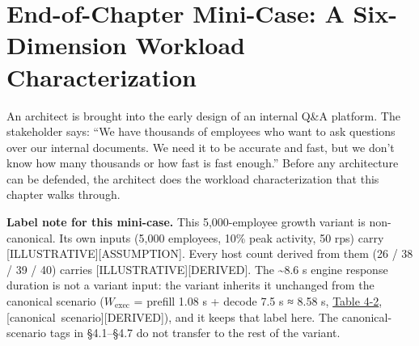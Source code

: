 \section{End-of-Chapter Mini-Case: A Six-Dimension Workload
Characterization}\label{end-of-chapter-mini-case-a-six-dimension-workload-characterization}

An architect is brought into the early design of an internal Q\&A
platform. The stakeholder says: ``We have thousands of employees who
want to ask questions over our internal documents. We need it to be
accurate and fast, but we don't know how many thousands or how fast is
fast enough.'' Before any architecture can be defended, the architect
does the workload characterization that this chapter walks through.

\textbf{Label note for this mini-case.} This 5,000-employee growth
variant is non-canonical. Its own inputs (5,000 employees, 10\% peak
activity, 50 rps) carry \mbox{{[}ILLUSTRATIVE{]}}\hspace{0pt}\mbox{{[}ASSUMPTION{]}}. Every host
count derived from them (26 / 38 / 39 / 40) carries
\mbox{{[}ILLUSTRATIVE{]}}\hspace{0pt}\mbox{{[}DERIVED{]}}. The \textasciitilde8.6 s engine
response duration is not a variant input: the variant inherits it
unchanged from the canonical scenario (\(W_{\mathrm{exec}}\) = prefill
1.08 s + decode 7.5 s ≈ 8.58 s, \hyperref[tab:4.2]{Table 4-2}, \mbox{{[}canonical
scenario{]}}\hspace{0pt}\mbox{{[}DERIVED{]}}), and it keeps that label here. The
canonical-scenario tags in §4.1--§4.7 do not transfer to the rest of the
variant.


